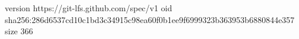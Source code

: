 version https://git-lfs.github.com/spec/v1
oid sha256:286d6537cd10c1bd3c34915c98ea60f0b1ee9f6999323b363953b6880844e357
size 366
